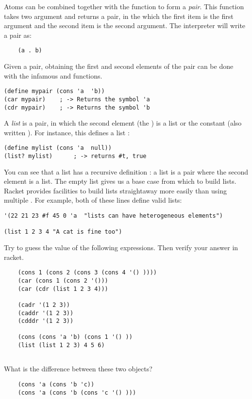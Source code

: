 \documentclass{../../../tp}
\begin{document}
Atoms can be combined together with the  function to form a \emph{pair}. This function takes two argument and returns a pair, in the which the first item is the first argument and the second item is the second argument. The \scheme interpreter will write a pair as:

\begin{verbatim}
	(a . b)
\end{verbatim}

Given a pair, obtaining the first and second elements of the pair can be done with the infamous  and  functions.

\begin{verbatim}
(define mypair (cons 'a  'b))
(car mypair)	; -> Returns the symbol 'a
(cdr mypair)	; -> Returns the symbol 'b
\end{verbatim}


A \emph{list} is a pair, in which the second element (the ) is a list or the constant  (also written ). For instance, this defines a list :

\begin{verbatim}
(define mylist (cons 'a  null))
(list? mylist) 		; -> returns #t, true
\end{verbatim}

You can see that a list has a recursive definition : a list is a pair where the second element is a list. The empty list  gives us a base case from which to build lists. Racket provides facilities to build lists straightaway more easily than using multiple . For example, both of these lines define valid lists:

\begin{verbatim}
'(22 21 23 #f 45 0 'a  "lists can have heterogeneous elements")

(list 1 2 3 4 "A cat is fine too")
\end{verbatim}



\begin{instruction}
Try to guess the value of the following expressions. Then verify your answer in racket.

\begin{verbatim}
	(cons 1 (cons 2 (cons 3 (cons 4 '() ))))
	(car (cons 1 (cons 2 '()))
	(car (cdr (list 1 2 3 4)))
	
	(cadr '(1 2 3))
	(caddr '(1 2 3))
	(cdddr '(1 2 3))
	
	(cons (cons 'a 'b) (cons 1 '() ))
	(list (list 1 2 3) 4 5 6)
	
\end{verbatim}
	
What is the difference between these two objects?
		
	\begin{verbatim}
	(cons 'a (cons 'b 'c))
	(cons 'a (cons 'b (cons 'c '() ))) 	
	\end{verbatim}
			
\end{instruction}
\end{document}
